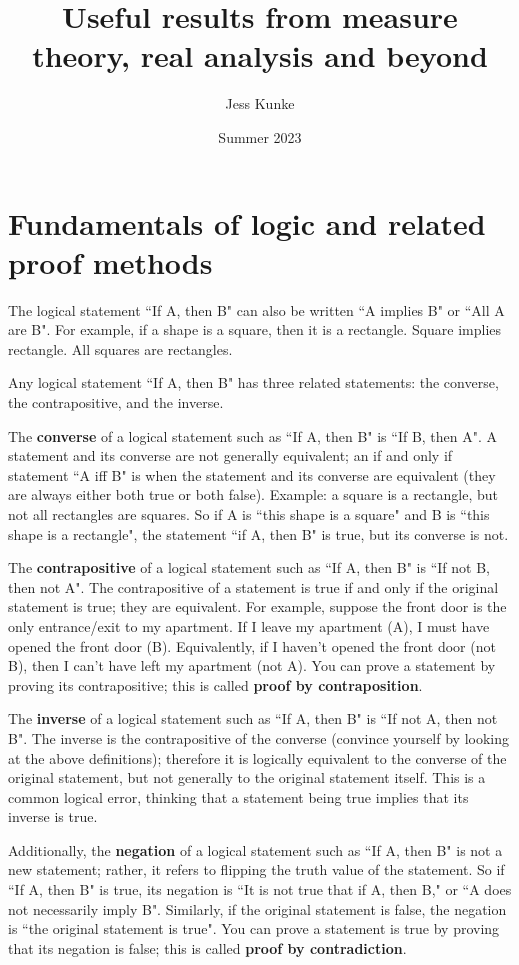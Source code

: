 \documentclass{article}
\title{\vspace{-1cm}Useful results from measure theory, real analysis and beyond}
\author{Jess Kunke}
\date{Summer 2023}
\begin{document}
\maketitle

\section*{Fundamentals of logic and related proof methods}

The logical statement ``If A, then B" can also be written ``A implies B" or ``All A are B". For example, if a shape is a square, then it is a rectangle. Square implies rectangle. All squares are rectangles.

Any logical statement ``If A, then B" has three related statements: the converse, the contrapositive, and the inverse.

The \textbf{converse} of a logical statement such as ``If A, then B" is ``If B, then A". A statement and its converse are not generally equivalent; an if and only if statement ``A iff B" is when the statement and its converse are equivalent (they are always either both true or both false). Example: a square is a rectangle, but not all rectangles are squares. So if A is ``this shape is a square" and B is ``this shape is a rectangle", the statement ``if A, then B" is true, but its converse is not.

The \textbf{contrapositive} of a logical statement such as ``If A, then B" is ``If not B, then not A". The contrapositive of a statement is true if and only if the original statement is true; they are equivalent. For example, suppose the front door is the only entrance/exit to my apartment. If I leave my apartment (A), I must have opened the front door (B).  Equivalently, if I haven't opened the front door (not B), then I can't have left my apartment (not A). You can prove a statement by proving its contrapositive; this is called \textbf{proof by contraposition}.

The \textbf{inverse} of a logical statement such as ``If A, then B" is ``If not A, then not B". The inverse is the contrapositive of the converse (convince yourself by looking at the above definitions); therefore it is logically equivalent to the converse of the original statement, but not generally to the original statement itself. This is a common logical error, thinking that a statement being true implies that its inverse is true.

Additionally, the \textbf{negation} of a logical statement such as ``If A, then B" is not a new statement; rather, it refers to flipping the truth value of the statement. So if ``If A, then B" is true, its negation is ``It is not true that if A, then B," or ``A does not necessarily imply B". Similarly, if the original statement is false, the negation is ``the original statement is true". You can prove a statement is true by proving that its negation is false; this is called \textbf{proof by contradiction}.
\end{document}
